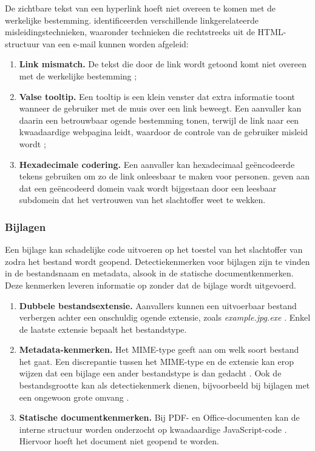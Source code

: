 De zichtbare tekst van een hyperlink hoeft niet overeen te komen met de werkelijke bestemming. \textcite{Veit2025} identificeerden verschillende linkgerelateerde misleidingstechnieken, waaronder technieken die rechtstreeks uit de HTML-structuur van een e-mail kunnen worden afgeleid:

\begin{enumerate}
    \item \textbf{Link mismatch.} De tekst die door de link wordt getoond komt niet overeen met de werkelijke bestemming \autocite{Fette2007,Veit2025};
    \item \textbf{Valse tooltip.} Een tooltip is een klein venster dat extra informatie toont wanneer de gebruiker met de muis over een link beweegt. Een aanvaller kan daarin een betrouwbaar ogende bestemming tonen, terwijl de link naar een kwaadaardige webpagina leidt, waardoor de controle van de gebruiker misleid wordt \autocite{Veit2025};
    \item \textbf{Hexadecimale codering.} Een aanvaller kan hexadecimaal geëncodeerde tekens gebruiken om zo de link onleesbaar te maken voor personen. \textcite{Veit2025} geven aan dat een geëncodeerd domein vaak wordt bijgestaan door een leesbaar subdomein dat het vertrouwen van het slachtoffer weet te wekken.
\end{enumerate}

\subsubsection{Bijlagen}
\label{subsubsec:bijlagen}

Een bijlage kan schadelijke code uitvoeren op het toestel van het slachtoffer van zodra het bestand wordt geopend. 
Detectiekenmerken voor bijlagen zijn te vinden in de bestandsnaam en metadata, alsook in de statische documentkenmerken. Deze kenmerken leveren informatie op zonder dat de bijlage wordt uitgevoerd.

\begin{enumerate}
    \item \textbf{Dubbele bestandsextensie.} Aanvallers kunnen een uitvoerbaar bestand verbergen achter een onschuldig ogende extensie, zoals \emph{example.jpg.exe} \autocite{Alazab2016}. Enkel de laatste extensie bepaalt het bestandstype.
    \item \textbf{Metadata-kenmerken.} Het MIME-type geeft aan om welk soort bestand het gaat. Een discrepantie tussen het MIME-type en de extensie kan erop wijzen dat een bijlage een ander bestandstype is dan gedacht \autocite{Mendes2025}. Ook de bestandsgrootte kan als detectiekenmerk dienen, bijvoorbeeld bij bijlagen met een ongewoon grote omvang \autocite{Mendes2025}.
    \item \textbf{Statische documentkenmerken.} Bij PDF- en Office-documenten kan de interne structuur worden onderzocht op kwaadaardige JavaScript-code \autocite{Srndic2013}. Hiervoor hoeft het document niet geopend te worden.
\end{enumerate}

